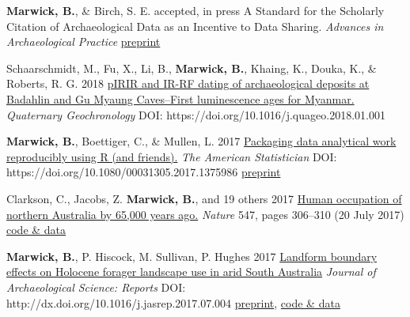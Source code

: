 \documentclass[11pt,article,oneside]{memoir}
\begin{document}

\ind \textbf{Marwick, B.}, \& Birch, S. E. accepted, in press A Standard for the Scholarly Citation of Archaeological Data as an Incentive to Data Sharing.  \textit{Advances in Archaeological Practice} \href{https://osf.io/preprints/socarxiv/py4hz/}{preprint}  

\ind Schaarschmidt, M., Fu, X., Li, B., \textbf{Marwick, B.}, Khaing, K., Douka, K., \& Roberts, R. G. 2018 \href{https://doi.org/10.1016/j.quageo.2018.01.001}{pIRIR and IR-RF dating of archaeological deposits at Badahlin and Gu Myaung Caves–First luminescence ages for Myanmar.} \textit{Quaternary Geochronology} DOI: https://doi.org/10.1016/j.quageo.2018.01.001

\ind \textbf{Marwick, B.}, Boettiger, C., \& Mullen, L. 2017 \href{https://doi.org/10.1080/00031305.2017.1375986}{Packaging data analytical work reproducibly using R (and friends).} \textit{The American Statistician} \newline DOI: https://doi.org/10.1080/00031305.2017.1375986 \href{https://doi.org/10.7287/peerj.preprints.3192v1}{preprint}

\ind  Clarkson, C., Jacobs, Z. \textbf{Marwick, B.}, and 19  others 2017 \href{http://dx.doi.org/10.1038/nature22968}{Human occupation of northern Australia by 65,000 years ago.} \textit{Nature} 547, pages 306–310 (20 July 2017) \href{https://doi.org/10.17605/OSF.IO/QWFCZ}{code \& data}

\ind  \textbf{Marwick, B.}, P. Hiscock, M. Sullivan, P. Hughes 2017 \href{http://dx.doi.org/10.1016/j.jasrep.2017.07.004}{Landform boundary effects on Holocene forager landscape use in arid South Australia} \textit{Journal of Archaeological Science: Reports} DOI: http://dx.doi.org/10.1016/j.jasrep.2017.07.004 \href{https://doi.org/10.17605/OSF.IO/V2MS9}{preprint}, \href{https://doi.org/10.17605/OSF.IO/EDZXS}{code \& data}
\end{document}
